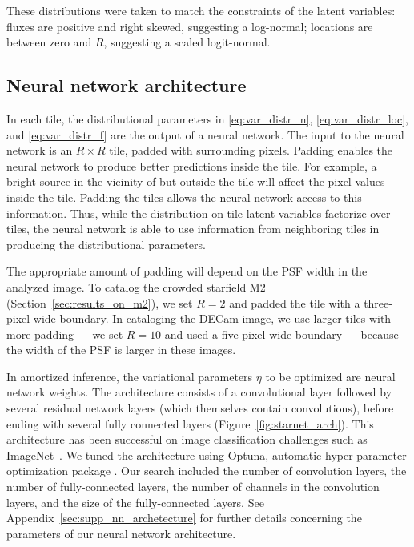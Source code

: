 These distributions were taken to match the constraints of the latent variables: fluxes are positive and right skewed, suggesting a log-normal; locations are between zero and $R$, suggesting a scaled logit-normal.

\subsection{Neural network architecture}
\label{sec:nn_archetecture}

In each tile, the distributional parameters in \eqref{eq:var_distr_n},
\eqref{eq:var_distr_loc}, and \eqref{eq:var_distr_f} are the output of a neural network.
The input to the neural network is an $R \times R$ tile, padded with surrounding pixels.
Padding enables the neural network to produce better predictions inside the tile.
For example, a bright source in the vicinity of but outside the tile will affect the pixel values inside the tile.
Padding the tiles allows the neural network access to this information.
Thus, while the distribution on tile latent variables factorize over tiles, the neural network is able to use information from neighboring tiles in producing the distributional parameters.

The appropriate amount of padding will depend on the PSF width in the analyzed image.
To catalog the crowded starfield M2 (Section~\ref{sec:results_on_m2}),
we set $R = 2$ and padded the tile with a three-pixel-wide boundary.
In cataloging the DECam image, we use larger tiles with more padding ---
we set $R = 10$ and used a five-pixel-wide boundary ---
because the width of the PSF is larger in these images.


In amortized inference, the variational parameters $\eta$ to be optimized are neural network weights.
The architecture consists of a convolutional layer followed by several residual network layers (which themselves contain convolutions), before ending with several fully connected layers (Figure~\ref{fig:starnet_arch}).
This architecture has been successful on image classification challenges such as ImageNet~\citep{imagenet2015}.
We tuned the architecture using Optuna, automatic hyper-parameter optimization package \citep{optuna_2019}. 
Our search included the number of convolution layers, 
the number of fully-connected layers,
the number of channels in the convolution layers, and the size of the fully-connected layers. 
See Appendix~\ref{sec:supp_nn_archetecture} for further details 
concerning the parameters of our neural network architecture. 


